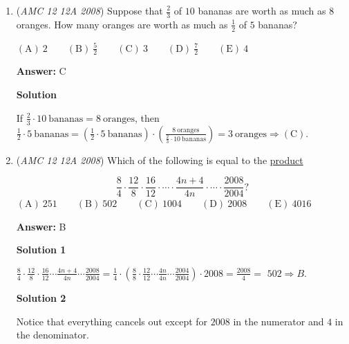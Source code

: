 \begin{enumerate}
 



\textbf{Solution 3}

If you completely don't know how to add fractions, just notice that only choices A and choices B are reciprocals of each other, so just guess between A and B and you have a $0.5$ chance of getting it correct.

 


	\item (\textit{AMC 12 12A 2008}) Suppose that $\frac{2}{3}$ of $10$ bananas are worth as much as $8$ oranges. How many oranges are worth as much as $\frac{1}{2}$ of $5$ bananas?


 $\mathrm{(A)}\ 2\qquad\mathrm{(B)}\ \frac{5}{2}\qquad\mathrm{(C)}\ 3\qquad\mathrm{(D)}\ \frac{7}{2}\qquad\mathrm{(E)}\ 4$

 \textbf{Answer: }C



\textbf{Solution}

If $\frac{2}{3}\cdot10\ \text{bananas}=8\ \text{oranges}$, then $\frac{1}{2}\cdot5\ \text{bananas}=\left(\frac{1}{2}\cdot 5\ \text{bananas}\right)\cdot\left(\frac{8\ \text{oranges}}{\frac{2}{3}\cdot10\ \text{bananas}}\right)=3\ \text{oranges}\Longrightarrow\mathrm{(C)}$. 

 


	\item (\textit{AMC 12 12A 2008}) Which of the following is equal to the \href{https://artofproblemsolving.com/wiki/index.php?title=Product}{product}

 \[\frac{8}{4}\cdot\frac{12}{8}\cdot\frac{16}{12}\cdot\cdots\cdot\frac{4n+4}{4n}\cdot\cdots\cdot\frac{2008}{2004}?\]
$\mathrm{(A)}\ 251\qquad\mathrm{(B)}\ 502\qquad\mathrm{(C)}\ 1004\qquad\mathrm{(D)}\ 2008\qquad\mathrm{(E)}\ 4016$

 \textbf{Answer: }B



\textbf{Solution 1}

$\frac {8}{4}\cdot\frac {12}{8}\cdot\frac {16}{12}\cdots\frac {4n + 4}{4n}\cdots\frac {2008}{2004} = \frac {1}{4}\cdot\left(\frac {8}{8}\cdot\frac {12}{12}\cdots\frac {4n}{4n}\cdots\frac {2004}{2004}\right)\cdot 2008 = \frac{2008}{4} =$ $502 \Rightarrow B$. 

 



\textbf{Solution 2}

Notice that everything cancels out except for $2008$ in the numerator and $4$ in the denominator.


\end{enumerate}
